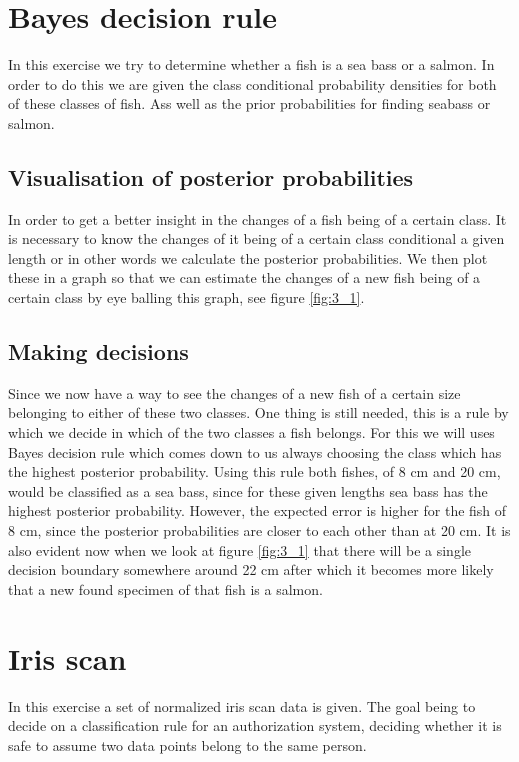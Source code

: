 \documentclass[10pt,a4paper]{article}
\begin{document}
\section{Bayes decision rule}
In this exercise we try to determine whether a fish is a sea bass or a salmon. In order to do this we are given the class conditional probability densities for both of these classes of fish. Ass well as the prior probabilities for finding seabass or salmon.

\subsection{Visualisation of posterior probabilities}
In order to get a better insight in the changes of a fish being of a certain class. It is necessary to know the changes of it being of a certain class conditional a given length or in other words we calculate the posterior probabilities. We then plot these in a graph so that we can estimate the changes of a new fish being of a certain class by eye balling this graph, see figure \ref{fig:3_1}.

\subsection{Making decisions}
Since we now have a way to see the changes of a new fish of a certain size belonging to either of these two classes. One thing is still needed, this is a rule by which we decide in which of the two classes a fish belongs. For this we will uses Bayes decision rule which comes down to us always choosing the class which has the highest posterior probability. Using this rule both fishes, of 8 cm and 20 cm, would be classified as a sea bass, since for these given lengths sea bass has the highest posterior probability. However, the expected error is higher for the fish of 8 cm, since the posterior probabilities are closer to each other than at 20 cm. It is also evident now when we look at figure \ref{fig:3_1} that there will be a single decision boundary somewhere around 22 cm after which it becomes more likely that a new found specimen of that fish is a salmon.

\section{Iris scan}
In this exercise a set of normalized iris scan data is given. The goal being to decide on a classification rule for an authorization system, deciding whether it is safe to assume two data points belong to the same person.
\end{document}
